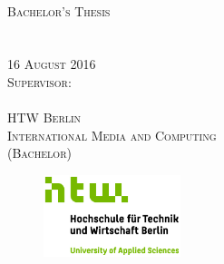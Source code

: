 
\thispagestyle{empty}

\begin{center}

\vspace*{1.5cm}
\huge
\textsc{\thesistitle}\\

\vspace{3cm}

\Large
\textsc{Bachelor's Thesis\\[0.5\baselineskip]
\thesisauthor\\
\matrikelnr}\\

\vspace{2cm}
\textsc{16 August 2016}\\

\vspace{1cm}
\textsc{Supervisor:\\
\firstsupervisor}\\

\vspace{0.5cm}
\textsc{HTW Berlin\\
International Media and Computing \\
(Bachelor)}

\begin{figure}
\includegraphics[width=4cm]{htw_logos/htw_berlin_logo.jpg}
\end{figure}

\end{center}

\addtocounter{page}{-1}